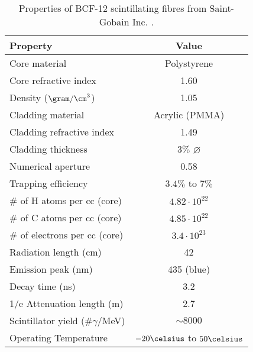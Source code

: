 \begin{table}[htbp]
\centering{}%
\begin{tabular}{lc}
\toprule 
Property & Value \tabularnewline
\midrule
\midrule 
Core material & Polystyrene \tabularnewline
Core refractive index & 1.60 \tabularnewline
Density ($\gram/\cm^3$) & 1.05 \tabularnewline
Cladding material & Acrylic (PMMA) \tabularnewline
Cladding refractive index & 1.49 \tabularnewline
Cladding thickness & $3\%$  $\varnothing$ \tabularnewline
Numerical aperture & 0.58 \tabularnewline
Trapping efficiency & $3.4\%$ to $7\%$ \tabularnewline
$\#$ of H atoms per cc (core) & $4.82 \cdot{} 10^{22}$ \tabularnewline
$\#$ of C atoms per cc (core) & $4.85 \cdot{} 10^{22}$ \tabularnewline
$\#$ of electrons per cc (core) & $3.4 \cdot{} 10^{23}$ \tabularnewline
Radiation length (cm) & 42 \tabularnewline
Emission peak (nm) & 435 (blue) \tabularnewline
Decay time (ns) & 3.2 \tabularnewline
1/e Attenuation length (m) & 2.7 \tabularnewline
Scintillator yield (\#$\gamma$/MeV) & $\sim 8000$ \tabularnewline
Operating Temperature & $-20\celsius$ to $50\celsius$ \tabularnewline
\bottomrule
\end{tabular}
\caption{Properties of BCF-12 scintillating fibres from Saint-Gobain Inc. \cite{DataSheetBCF12Fiber}.}
\label{tab:ParametersFibersBCF12}
\end{table}